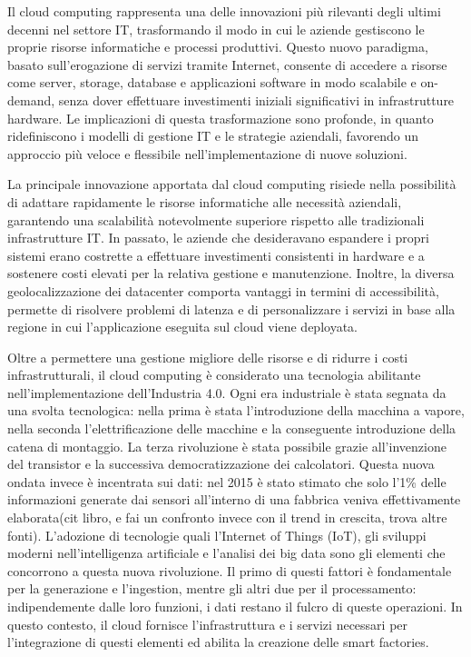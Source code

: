 Il cloud computing rappresenta una delle innovazioni più rilevanti degli ultimi decenni nel settore IT, trasformando il modo in cui le aziende gestiscono le proprie risorse informatiche e processi produttivi. Questo nuovo paradigma, basato sull’erogazione di servizi tramite Internet, consente di accedere a risorse come server, storage, database e applicazioni software in modo scalabile e on-demand, senza dover effettuare investimenti iniziali significativi in infrastrutture hardware. Le implicazioni di questa trasformazione sono profonde, in quanto ridefiniscono i modelli di gestione IT e le strategie aziendali, favorendo un approccio più veloce e flessibile nell’implementazione di nuove soluzioni.

La principale innovazione apportata dal cloud computing risiede nella possibilità di adattare rapidamente le risorse informatiche alle necessità aziendali, garantendo una scalabilità notevolmente superiore rispetto alle tradizionali infrastrutture IT. In passato, le aziende che desideravano espandere i propri sistemi erano costrette a effettuare investimenti consistenti in hardware e a sostenere costi elevati per la relativa gestione e manutenzione. Inoltre, la diversa geolocalizzazione dei datacenter comporta vantaggi in termini di accessibilità, permette di risolvere problemi di latenza e di personalizzare i servizi in base alla regione in cui l'applicazione eseguita sul cloud viene deployata. 


Oltre a permettere una gestione migliore delle risorse e di ridurre i costi infrastrutturali, il cloud computing è considerato una tecnologia abilitante nell'implementazione dell’Industria 4.0. Ogni era industriale è stata segnata da una svolta tecnologica: nella prima è stata l'introduzione della macchina a vapore, nella seconda l'elettrificazione delle macchine e la conseguente introduzione della catena di montaggio. La terza rivoluzione è stata possibile grazie all'invenzione del transistor e la successiva democratizzazione dei calcolatori. Questa nuova ondata invece è incentrata sui dati: nel 2015 è stato stimato che solo l'1\% delle informazioni generate dai sensori all'interno di una fabbrica veniva effettivamente elaborata(cit libro, e fai un confronto invece con il trend in crescita, trova altre fonti).  L’adozione di tecnologie quali l’Internet of Things (IoT), gli sviluppi moderni nell'intelligenza artificiale e l’analisi dei big data sono gli elementi che concorrono a questa nuova rivoluzione. Il primo di questi fattori è fondamentale per la generazione e l'ingestion, mentre gli altri due per il processamento: indipendemente dalle loro funzioni, i dati restano il fulcro di queste operazioni. In questo contesto, il cloud fornisce l'infrastruttura e i servizi necessari per l'integrazione di questi elementi ed abilita la creazione delle smart factories. 

